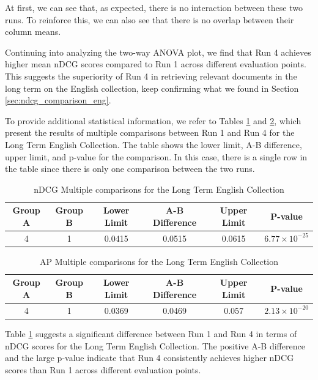 At first, we can see that, as expected, there is no interaction between these two runs. To reinforce this, we can also see that there is no overlap between their column means.

Continuing into analyzing the two-way \ac{ANOVA} plot, we find that Run 4 achieves higher mean \ac{nDCG} scores compared to Run 1 across different evaluation points. 
This suggests the superiority of Run 4 in retrieving relevant documents in the long term on the English collection, keep confirming what we found in Section \ref{sec:ndcg_comparison_eng}. 

To provide additional statistical information, we refer to Tables \ref{table:lt_anova_eng} and \ref{table:lt_anova_eng_ap}, which present the results of multiple comparisons between Run 1 and Run 4 for the Long Term English Collection. 
The table shows the lower limit, A-B difference, upper limit, and p-value for the comparison. 
In this case, there is a single row in the table since there is only one comparison between the two runs.

\begin{table}[!h]
    \centering
    \caption{\ac{nDCG} Multiple comparisons for the Long Term English Collection}
    \label{table:lt_anova_eng}
    \begin{tabular}{cccccc}
    \hline
    Group A & Group B & Lower Limit & A-B Difference & Upper Limit & P-value \\
    \hline
    4 & 1 & 0.0415 & 0.0515 & 0.0615 & $6.77 \times 10^{-25}$ \\
    \hline
    \end{tabular}
\end{table}

\begin{table}[!h]
    \centering
    \caption{\ac{AP} Multiple comparisons for the Long Term English Collection}
    \label{table:lt_anova_eng_ap}
    \begin{tabular}{cccccc}
    \hline
    Group A & Group B & Lower Limit & A-B Difference & Upper Limit & P-value \\
    \hline
    4 & 1 & 0.0369 & 0.0469 & 0.057 & $2.13 \times 10^{-20}$ \\
    \hline
    \end{tabular}
\end{table}
    
Table \ref{table:lt_anova_eng} suggests a significant difference between Run 1 and Run 4 in terms of \ac{nDCG} scores for the Long Term English Collection. 
The positive A-B difference and the large p-value indicate that Run 4 consistently achieves higher \ac{nDCG} scores than Run 1 across different evaluation points.

